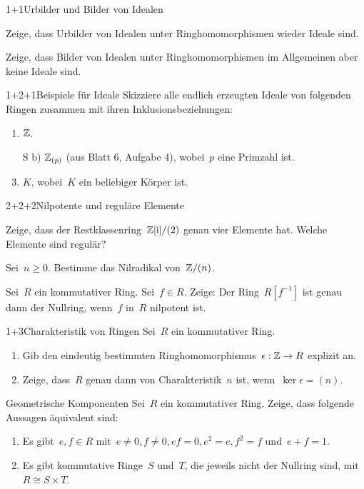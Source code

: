 \documentclass{algblatt}
\begin{document}

\begin{aufgabeE}{1+1}{Urbilder und Bilder von Idealen}
\item Zeige, dass Urbilder von Idealen unter Ringhomomorphismen wieder Ideale
sind.
\item Zeige, dass Bilder von Idealen unter Ringhomomorphismen im Allgemeinen
aber keine Ideale sind.
\end{aufgabeE}

\begin{aufgabe}{1+2+1}{Beispiele für Ideale}
Skizziere alle endlich erzeugten Ideale von folgenden Ringen zusammen mit ihren
Inklusionsbeziehungen:
\begin{enumerate}
\item $\mathbb{Z}$.
\item[S b)] $\mathbb{Z}_{(p)}$ (aus Blatt 6, Aufgabe 4), wobei~$p$ eine Primzahl ist.
\item $K$, wobei~$K$ ein beliebiger Körper ist.
\end{enumerate}
\end{aufgabe}

\begin{aufgabeE}{2+2+2}{Nilpotente und reguläre Elemente}
\item Zeige, dass der Restklassenring~$\mathbb{Z}[\mathrm{i}]/(2)$ genau vier Elemente hat.
Welche Elemente sind regulär?
\item Sei~$n \geq 0$. Bestimme das Nilradikal von~$\mathbb{Z}/(n)$.
\item Sei~$R$ ein kommutativer Ring. Sei~$f \in R$. Zeige: Der Ring~$R[f^{-1}]$ ist
genau dann der Nullring, wenn~$f$ in~$R$ nilpotent ist.
\end{aufgabeE}

\begin{aufgabe}{1+3}{Charakteristik von Ringen}
Sei~$R$ ein kommutativer Ring.
\begin{enumerate}
\item Gib den eindeutig bestimmten Ringhomomorphismus~$\epsilon : \mathbb{Z} \to R$
explizit an.
\item Zeige, dass~$R$ genau dann von Charakteristik~$n$ ist, wenn~$\ker
\epsilon = (n)$.
\end{enumerate}
\end{aufgabe}

\begin{aufgabe}{4}{Geometrische Komponenten}
Sei~$R$ ein kommutativer Ring. Zeige, dass folgende Aussagen äquivalent sind:
\begin{enumerate}
\item Es gibt~$e, f \in R$ mit~$e \neq 0, f \neq 0, ef = 0, e^2 = e, f^2 = f$
und~$e + f = 1$.
\item Es gibt kommutative Ringe~$S$ und~$T$, die jeweils nicht der Nullring
sind, mit~$R \cong S \times T$.
\end{enumerate}
\end{aufgabe}
\end{document}
